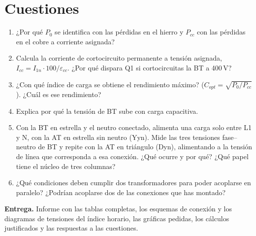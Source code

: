 \documentclass[11pt,a4paper]{article}
\begin{document}
\section{Cuestiones}
\begin{enumerate}
  \item ¿Por qué $P_0$ se identifica con las pérdidas en el hierro y $P_{cc}$ con las pérdidas en el cobre a corriente asignada?
  \item Calcula la corriente de cortocircuito permanente a tensión asignada, $I_{cc} = I_{1n}\cdot 100/\varepsilon_{cc}$. ¿Por qué dispara Q1 si cortocircuitas la BT a 400\,V?
  \item ¿Con qué índice de carga se obtiene el rendimiento máximo? ($C_{opt} = \sqrt{P_0/P_{cc}}$). ¿Cuál es ese rendimiento?
  \item Explica por qué la tensión de BT sube con carga capacitiva.
  \item Con la BT en estrella y el neutro conectado, alimenta una carga solo entre L1 y N, con la AT en estrella sin neutro (Yyn). Mide las tres tensiones fase–neutro de BT y repite con la AT en triángulo (Dyn), alimentando a la tensión de línea que corresponda a esa conexión. ¿Qué ocurre y por qué? ¿Qué papel tiene el núcleo de tres columnas?
  \item ¿Qué condiciones deben cumplir dos transformadores para poder acoplarse en paralelo? ¿Podrían acoplarse dos de las conexiones que has montado?
\end{enumerate}

\vfill
\begin{nota}
  \textbf{Entrega.} Informe con las tablas completas, los esquemas de conexión y los diagramas de tensiones del índice horario, las gráficas pedidas, los cálculos justificados y las respuestas a las cuestiones.
\end{nota}
\end{document}
